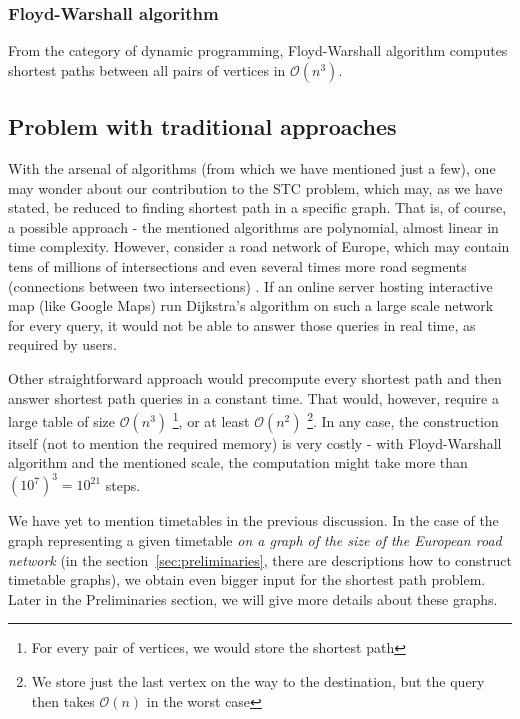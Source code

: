 \documentclass[a4paper]{article}
\begin{document}

            \subsubsection{Floyd-Warshall algorithm}
            From the category of dynamic programming, Floyd-Warshall algorithm computes shortest paths between all pairs of vertices in $\mathcal{O}(n^{3})$.

        \subsection{Problem with traditional approaches}
        With the arsenal of algorithms (from which we have mentioned just a few), one may wonder about our contribution to the STC problem, which may, as we have stated, be reduced to finding shortest path in a specific graph. That is, of course, a possible approach - the mentioned algorithms are polynomial, almost linear in time complexity. However, consider a road network of Europe, which may contain %
        tens of millions of intersections and even several times more road segments (connections between two intersections) . If an online server hosting interactive map (like Google Maps) run Dijkstra's algorithm on such a large scale network for every query, it would not be able to answer those queries in real time, as required by users.

        Other straightforward approach would precompute every shortest path and then answer shortest path queries in a constant time. That would, however, require a large table of size $\mathcal{O}(n^3)$ \footnote{For every pair of vertices, we would store the shortest path}, or at least $\mathcal{O}(n^2)$ \footnote{We store just the last vertex on the way to the destination, but the query then takes $\mathcal{O}(n)$ in the worst case}. In any case, the construction itself (not to mention the required memory) is very costly - with Floyd-Warshall algorithm and the mentioned scale, the computation might take more than $(10^{7})^{3} = 10^{21}$ steps.

        We have yet to mention timetables in the previous discussion. In the case of the graph representing a given timetable \emph{on a graph of the size of the European road network} (in the section~\ref{sec:preliminaries}, %
        there are descriptions how to construct timetable graphs), we obtain even bigger input for the shortest path problem. Later in the Preliminaries section, we will give more details about these graphs.
\end{document}
